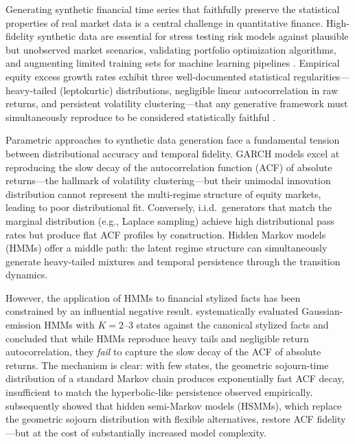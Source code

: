 Generating synthetic financial time series that faithfully preserve the statistical properties of real market data is a central challenge in quantitative finance.
High-fidelity synthetic data are essential for stress testing risk models against plausible but unobserved market scenarios, validating portfolio optimization algorithms, and augmenting limited training sets for machine learning pipelines \citep{assefa2020generating, jordon2022synthetic}.
Empirical equity excess growth rates exhibit three well-documented statistical regularities---heavy-tailed (leptokurtic) distributions, negligible linear autocorrelation in raw returns, and persistent volatility clustering---that any generative framework must simultaneously reproduce to be considered statistically faithful \citep{cont2001empirical, mandelbrot1963variation}.

Parametric approaches to synthetic data generation face a fundamental tension between distributional accuracy and temporal fidelity.
GARCH models \citep{engle1982autoregressive, bollerslev1986generalized} excel at reproducing the slow decay of the autocorrelation function (ACF) of absolute returns---the hallmark of volatility clustering---but their unimodal innovation distribution cannot represent the multi-regime structure of equity markets, leading to poor distributional fit.
Conversely, i.i.d.\ generators that match the marginal distribution (e.g., Laplace sampling) achieve high distributional pass rates but produce flat ACF profiles by construction.
Hidden Markov models (HMMs) offer a middle path: the latent regime structure can simultaneously generate heavy-tailed mixtures and temporal persistence through the transition dynamics.

However, the application of HMMs to financial stylized facts has been constrained by an influential negative result.
\citet{ryden1998stylized} systematically evaluated Gaussian-emission HMMs with $K = 2$--$3$ states against the canonical stylized facts and concluded that while HMMs reproduce heavy tails and negligible return autocorrelation, they \emph{fail} to capture the slow decay of the ACF of absolute returns.
The mechanism is clear: with few states, the geometric sojourn-time distribution of a standard Markov chain produces exponentially fast ACF decay, insufficient to match the hyperbolic-like persistence observed empirically.
\citet{bulla2006stylized} subsequently showed that hidden semi-Markov models (HSMMs), which replace the geometric sojourn distribution with flexible alternatives, restore ACF fidelity---but at the cost of substantially increased model complexity.

